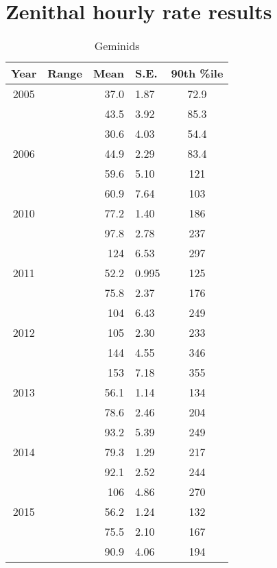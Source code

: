 \chapter{Zenithal hourly rate results}
\label{app:zhr}

\begin{table}[h!]
	\centering
	\begin{tabular}{|c|c|r@{ \,$\pm$\, }l|c|}
		\hline 
		Year & Range & Mean & S.E. & 90th \%ile\\ 
		\hline 
		2005 & & 37.0 & 1.87 & 72.9   \\ 
		\hline 
		& & 43.5 & 3.92 & 85.3   \\ 
		\hline 
		& & 30.6 & 4.03 & 54.4   \\ 
		\hline 
		2006 & & 44.9 & 2.29 & 83.4   \\ 
		\hline 
		& &	 59.6 & 5.10 & 121   \\ 
		\hline 
		& & 60.9 & 7.64 & 103   \\ 
		\hline 
		2010 & & 77.2 & 1.40 & 186   \\ 
		\hline 
		& & 97.8 & 2.78 & 237   \\ 
		\hline 
		& &	124 & 6.53 & 297   \\ 
		\hline 
		2011 & & 52.2 & 0.995 & 125   \\ 
		\hline 
		& & 75.8 & 2.37 & 176   \\ 
		\hline 
		& & 104 & 6.43 & 249   \\ 
		\hline 
		2012 & & 105 & 2.30 & 233   \\ 
		\hline
		& & 144 & 4.55 & 346   \\ 
		\hline 
		& & 153 & 7.18 & 355   \\ 
		\hline 
		2013 & & 56.1 & 1.14 & 134   \\ 
		\hline 
		& & 78.6 & 2.46 & 204   \\ 
		\hline 
		& & 93.2 & 5.39 & 249   \\ 
		\hline 
		2014 & & 79.3 & 1.29 & 217   \\ 
		\hline 
		& & 92.1 & 2.52 & 244   \\ 
		\hline 
		& & 106 & 4.86 & 270   \\ 
		\hline 
		2015 & & 56.2 & 1.24 & 132   \\ 
		\hline 
		& & 75.5 & 2.10 & 167   \\ 
		\hline 
		& & 90.9 & 4.06 & 194   \\ 
		\hline 
	\end{tabular} 
\caption{Geminids}
\end{table}


